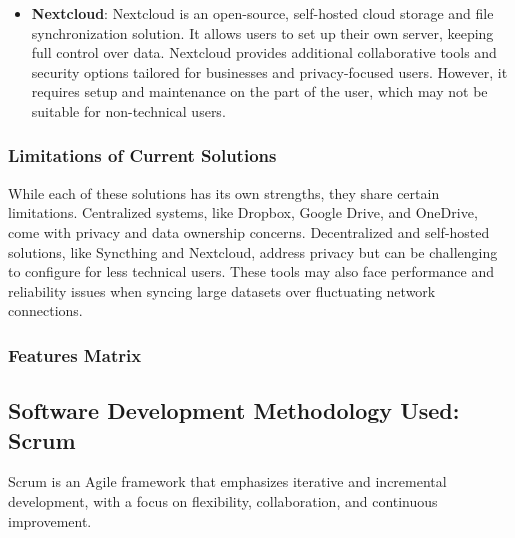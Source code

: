 \documentclass{article}
\begin{document}
\begin{itemize}
      \item \textbf{Nextcloud}: Nextcloud is an open-source, self-hosted cloud storage and file synchronization solution. It allows users to set up their own server, keeping full control over data. Nextcloud provides additional collaborative tools and security options tailored for businesses and privacy-focused users. However, it requires setup and maintenance on the part of the user, which may not be suitable for non-technical users.
  \end{itemize}

      \subsubsection{Limitations of Current Solutions}
      {
        While each of these solutions has its own strengths, they share certain limitations. Centralized systems, like Dropbox, Google Drive, and OneDrive, come with privacy and data ownership concerns. Decentralized and self-hosted solutions, like Syncthing and Nextcloud, address privacy but can be challenging to configure for less technical users. These tools may also face performance and reliability issues when syncing large datasets over fluctuating network connections.
      }
      \subsubsection{Features Matrix}
			
		\subsection{Software Development Methodology Used: Scrum}
        Scrum is an Agile framework that emphasizes iterative and incremental
        development, with a focus on flexibility, collaboration, and continuous
        improvement. \\
\end{document}
